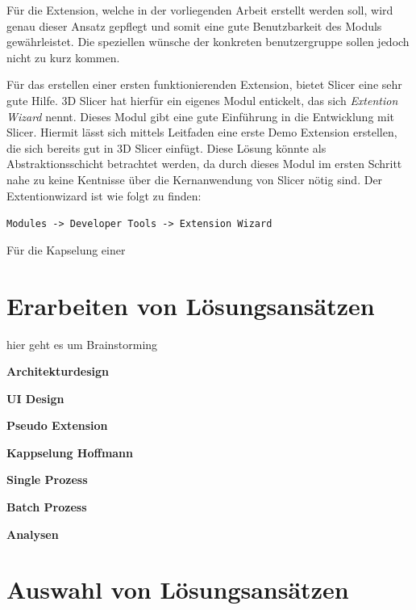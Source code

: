 Für die Extension, welche in der vorliegenden Arbeit erstellt werden soll, wird genau
dieser Ansatz gepflegt und somit eine gute Benutzbarkeit des Moduls gewährleistet.
Die speziellen wünsche der konkreten benutzergruppe sollen jedoch nicht zu kurz
kommen.

Für das erstellen einer ersten funktionierenden Extension, bietet Slicer eine sehr
gute Hilfe. 3D Slicer hat hierfür ein eigenes Modul entickelt, das sich \textit{Extention
Wizard} nennt. Dieses Modul gibt eine gute Einführung in die Entwicklung mit Slicer.
Hiermit lässt sich mittels Leitfaden eine erste Demo Extension erstellen, die sich
bereits gut in 3D Slicer einfügt. Diese Lösung könnte als Abstraktionsschicht betrachtet
werden, da durch dieses Modul im ersten Schritt nahe zu keine Kentnisse über die Kernanwendung
von Slicer nötig sind. Der Extentionwizard ist wie folgt zu finden:

\texttt{Modules -> Developer Tools -> Extension Wizard}

Für die Kapselung einer 



\section{Erarbeiten von Lösungsansätzen}
\label{sec:lösungsansätze} hier geht es um Brainstorming

\textbf{Architekturdesign}

\textbf{UI Design}

\textbf{Pseudo Extension}

\textbf{Kappselung Hoffmann}

\textbf{Single Prozess}

\textbf{Batch Prozess}

\textbf{Analysen}

\section{Auswahl von Lösungsansätzen}